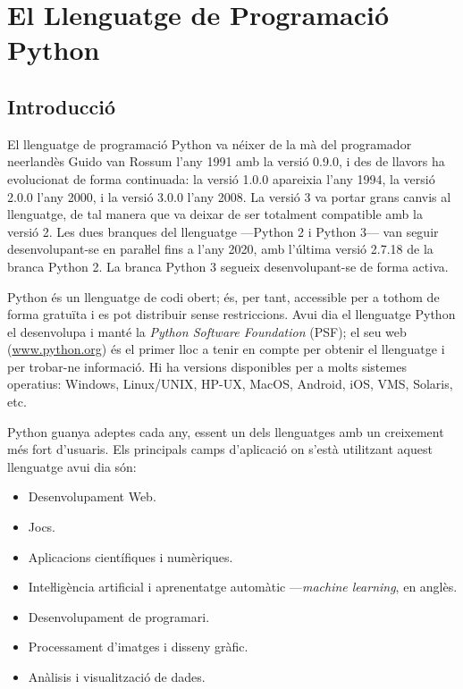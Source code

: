 \chapter{El Llenguatge de Programació Python}\label{chap:python-llenguatge}


\section{Introducció}

El llenguatge de programació Python va néixer de la mà del programador neerlandès Guido van Rossum l'any 1991 amb la versió 0.9.0, i des de llavors  ha evolucionat de forma continuada: la versió 1.0.0 apareixia l'any 1994, la versió 2.0.0 l'any 2000, i la versió 3.0.0 l'any 2008. La versió 3 va portar grans canvis al llenguatge, de tal manera que va deixar de ser totalment compatible amb la versió 2. Les dues branques del llenguatge ---Python 2 i Python 3--- van seguir desenvolupant-se en paraŀlel fins a l'any 2020, amb l'última versió  2.7.18  de la branca Python 2. La branca Python 3 segueix desenvolupant-se de forma activa.


Python és un llenguatge de codi obert; és, per tant, accessible per a tothom de forma gratuïta i  es pot distribuir sense restriccions.  Avui  dia el llenguatge Python el desenvolupa i manté la \textit{Python Software Foundation} (PSF); el seu web (\href{https://www.python.org/}{www.python.org}) és el primer lloc a tenir en compte per obtenir el llenguatge i per trobar-ne informació. Hi ha versions disponibles per a molts sistemes operatius: Windows, Linux/UNIX, HP-UX, MacOS, Android, iOS, VMS, Solaris, etc.

Python guanya adeptes cada any, essent un dels llenguatges amb un creixement més fort d'usuaris. Els principals camps d'aplicació on s'està utilitzant aquest llenguatge avui dia són:
\begin{itemize}
	\item Desenvolupament Web.
	\item Jocs.
	\item Aplicacions científiques i numèriques.
	\item Inteŀligència artificial i aprenentatge automàtic ---\textit{machine learning}, en anglès.
	\item Desenvolupament de programari.
	\item Processament d'imatges i disseny gràfic.
	\item Anàlisis i visualització de dades.
\end{itemize}

